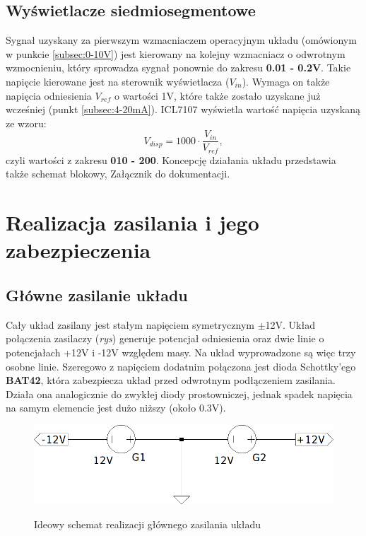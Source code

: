 \documentclass[12pt]{article}
\begin{document}
\subsection{Wyświetlacze siedmiosegmentowe}\label{subsec:7segmentowe}
Sygnał uzyskany za pierwszym wzmacniaczem operacyjnym układu (omówionym w punkcie \ref{subsec:0-10V}) jest kierowany na kolejny wzmacniacz o odwrotnym wzmocnieniu, który sprowadza sygnał ponownie do zakresu \textbf{0.01 - 0.2V}. Takie napięcie kierowane jest na sterownik wyświetlacza ($V_{in}$). Wymaga on także napięcia odniesienia $V_{ref}$ o wartości 1V, które także zostało uzyskane już wcześniej (punkt \ref{subsec:4-20mA}). ICL7107 wyświetla wartość napięcia uzyskaną ze wzoru:
\begin{equation*}
V_{disp} = 1000 \cdot \frac{V_{in}}{V_{ref}},
\end{equation*}
czyli wartości z zakresu \textbf{010 - 200}.
Koncepcję działania układu przedstawia także schemat blokowy, Załącznik do dokumentacji.

\section{Realizacja zasilania i jego zabezpieczenia}
\subsection{Główne zasilanie układu}
Cały układ zasilany jest stałym napięciem symetrycznym $\pm$12V. Układ połączenia zasilaczy (\textit{rys}) generuje potencjał odniesienia oraz dwie linie o potencjałach +12V i -12V względem masy. Na układ wyprowadzone są więc trzy osobne linie. Szeregowo z napięciem dodatnim połączona jest dioda Schottky'ego \textbf{BAT42}, która zabezpiecza układ przed odwrotnym podłączeniem zasilania. Działa ona analogicznie do zwykłej diody prostowniczej, jednak spadek napięcia na samym elemencie jest dużo niższy (około 0.3V).
\begin{figure}[h]
\centering
\includegraphics[scale=0.45]{power_supply.png}
\label{main_power_supply}
\caption{Ideowy schemat realizacji głównego zasilania układu}
\end{figure}
\end{document}
